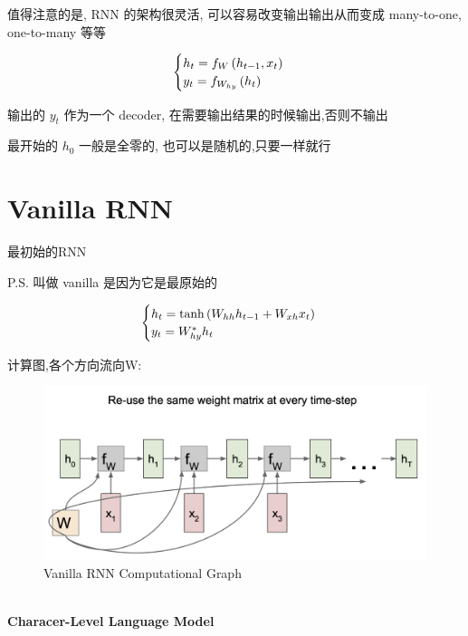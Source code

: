 	值得注意的是, RNN 的架构很灵活, 可以容易改变输出输出从而变成 many-to-one, one-to-many 等等

	\begin{equation}
		\begin{cases}
			h_t = f_W\left( h_{t-1}, x_t\right)
			\\
			y_t = f_{W_{hy}}\left( h_t\right)
		\end{cases}
	\end{equation}

	输出的 $y_t$ 作为一个 decoder, 在需要输出结果的时候输出,否则不输出

	最开始的 $h_0$ 一般是全零的, 也可以是随机的,只要一样就行

	\section{Vanilla RNN}

	最初始的RNN

	P.S. 叫做 vanilla 是因为它是最原始的

	\begin{equation}
		\begin{cases}
			h_t = \tanh\left( W_{hh}h_{t-1} + W_{xh}x_t\right)
			\\
			y_t = W_{hy}^*h_t
		\end{cases}
	\end{equation}
	
	计算图,各个方向流向W:
	
	\begin{figure}[htbp]
		\centering
		\includegraphics[scale=0.2]{figures/vanilla_rnn.png}
		\caption{Vanilla RNN Computational Graph}
	\end{figure}
	
	\textbf{\\Characer-Level Language Model}

